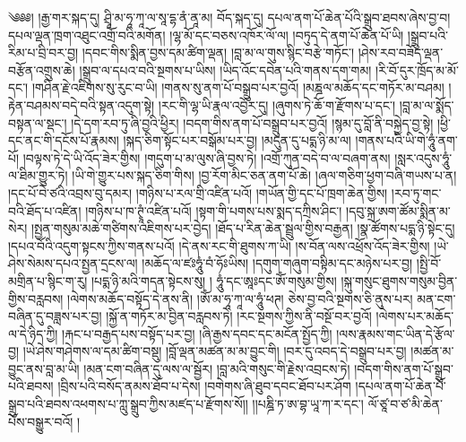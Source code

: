༄༅༅། །རྒྱ་གར་སྐད་དུ། ཤྲཱི་མ་ཧཱ་ཀཱ་ལ་སཱ་དྷ་ནཾ་ནཱ་མ། བོད་སྐད་དུ། དཔལ་ནག་པོ་ཆེན་པོའི་སྒྲུབ་ཐབས་ཞེས་བྱ་བ། དཔལ་ལྡན་ཁྲག་འཐུང་འགྲོ་བའི་མགོན། །ལྷ་མོ་དང་བཅས་འཁོར་ལོ་ལ། །བཏུད་དེ་ནག་པོ་ཆེན་པོ་ཡི། །སྒྲུབ་པའི་རིམ་པ་བྲི་བར་བྱ། །དབང་གིས་སྨིན་བྱས་དམ་ཚིག་ལྡན། །བླ་མ་ལ་གུས་སྙིང་བརྩེ་གཏོང་། །ཤེས་རབ་བཟོད་ལྡན་བརྩོན་འགྲུས་ཆེ། །སྒྲུབ་ལ་དཔའ་བའི་སྔགས་པ་ཡིས། །ཡིད་འོང་དབེན་པའི་གནས་དག་གམ། །རི་བོ་དུར་ཁྲོད་མ་མོ་དང་། །གཤིན་རྗེ་འཇིགས་སུ་རུང་བ་ཡི། །གནས་སུ་ནག་པོ་བསྒྲུབ་པར་བྱའོ། །མཎྜལ་མཆོད་དང་གཏོར་མ་བཤམ། །རྟེན་བཤམས་བདེ་བའི་སྟན་འདུག་སྟེ། །རང་གི་ལྷ་ཡི་རྣལ་འབྱོར་དུ། །ཞུགས་ཏེ་ཆོ་ག་རྫོགས་པ་དང་། །བླ་མ་ལ་སྨོད་བསྟན་ལ་སྡང་། །དེ་དག་རབ་ཏུ་ཞི་བྱའི་ཕྱིར། །བདག་གིས་ནག་པོ་བསྒྲུབ་པར་བྱའོ། །སྙམ་དུ་བློ་ནི་བསྐྱེད་བྱ་སྟེ། །ཕྱི་དང་ནང་གི་དངོས་པོ་རྣམས། །སྐད་ཅིག་སྟོང་པར་བསྒོམ་པར་བྱ། །མདུན་དུ་པདྨ་ཉི་མ་ལ། །གནས་པའི་ཡི་གེ་ཧཱུཾ་ནག་པོ། །བལྟས་ཏེ་དེ་ཡི་འོད་ཟེར་གྱིས། །གདུག་པ་མ་ལུས་ཞི་བྱས་ཏེ། །འགྲོ་ཀུན་བདེ་བ་ལ་བཞག་ནས། །སླར་འདུས་ཧཱུཾ་ལ་ཐིམ་གྱུར་ཏེ། །ཡི་གེ་གྱུར་པས་སྐད་ཅིག་གིས། །བྱ་རོག་མིང་ཅན་ནག་པོ་ཆེ། །ཞལ་གཅིག་ཕྱག་བཞི་གཡས་པ་ན། །དང་པོ་བེ་ཙའི་འབྲས་བུ་དམར། །གཉིས་པ་རལ་གྲི་འཛིན་པའོ། །གཡོན་གྱི་དང་པོ་ཁྲག་ཆེན་གྱིས། །རབ་ཏུ་གང་བའི་ཐོད་པ་འཛིན། །གཉིས་པ་ཁ་ཊྭཱཾ་འཛིན་པའོ། །སྟག་གི་པགས་པས་སྨད་དཀྲིས་ཤིང་། །དབུ་སྐྲ་ཨག་ཚོམ་སྨིན་མ་སེར། །སྤྱན་གསུམ་མཆེ་གཙིགས་འཇིགས་པར་བྱེད། །ཐོད་པ་རིན་ཆེན་སྦྲུལ་གྱིས་བརྒྱན། །སྣ་ཚོགས་པདྨ་ཉི་སྟེང་དུ། །དཔའ་བོའི་འདུག་སྟངས་ཀྱིས་གནས་པའོ། །དེ་ནས་རང་གི་ཐུགས་ཀ་ཡི། །ས་བོན་ལས་འཕྲོས་འོད་ཟེར་གྱིས། །ཡེ་ཤེས་སེམས་དཔའ་སྤྱན་དྲངས་ལ། །མཆོད་ལ་ཛཿཧཱུཾ་བཾ་ཧོཿཡིས། །དགུག་གཞུག་བསྟིམ་དང་མཉེས་པར་བྱ། །སྤྱི་བོ་མགྲིན་པ་སྙིང་ག་རུ། །པདྨ་ཉི་མའི་གདན་སྟེངས་སུ། །
ཧཱུཾ་དང་ཨཱཿདང་ཨོཾ་གསུམ་གྱིས། །སྐུ་གསུང་ཐུགས་གསུམ་བྱིན་གྱིས་བརླབས། །ལེགས་མཆོད་བསྟོད་དེ་ནས་ནི། །ཨོཾ་མ་ཧཱ་ཀཱ་ལ་ཧཱུཾ་ཕཊ། ཅེས་བྱ་བའི་སྔགས་ཅི་ནུས་པར། མན་ངག་བཞིན་དུ་བཟླས་པར་བྱ། །སྐྱོ་ན་གཏོར་མ་བྱིན་བརླབས་ཏེ། །རང་སྔགས་ཀྱིས་ནི་བསྔོ་བར་བྱའོ། །ལེགས་པར་མཆོད་ལ་དེ་ཉིད་ཀྱི། །རྐང་པ་བརྒྱད་པས་བསྟོད་པར་བྱ། །ཞི་རྒྱས་དབང་དང་མངོན་སྤྱོད་ཀྱི། །ལས་རྣམས་གང་ཡིན་དེ་རྩོལ་བྱ། །ཡེ་ཤེས་གཤེགས་ལ་དམ་ཚིག་བསྡུ། །བློ་ལྡན་མཚན་མ་མ་བྱུང་གི། །བར་དུ་འབད་དེ་བསྒྲུབ་པར་བྱ། །མཚན་མ་བྱུང་ནས་བླ་མ་ཡི། །མན་ངག་བཞིན་དུ་ལས་ལ་སྦྱོར། །བླ་མའི་གསུང་གི་རྗེས་འབྲངས་ཏེ། །བདག་གིས་ནག་པོ་སྒྲུབ་པའི་ཐབས། །བྲིས་པའི་བསོད་ནམས་ཐོབ་པ་དེས། །བགེགས་ཞི་ཐུབ་དབང་ཐོབ་པར་ཤོག །དཔལ་ནག་པོ་ཆེན་པོ་སྒྲུབ་པའི་ཐབས་འཕགས་པ་ཀླུ་སྒྲུབ་ཀྱིས་མཛད་པ་རྫོགས་སོ།། །།པཎྜི་ཏ་ཨ་བྷ་ཡཱ་ཀ་ར་དང་། ལོ་ཙཱ་བ་ཙ་མི་ཆེན་པོས་བསྒྱུར་བའོ། །